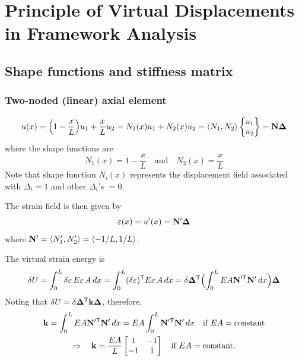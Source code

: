 \chapter[PVD in Framework Analysis]{Principle of Virtual Displacements in Framework Analysis}
\label{ch:pvd2}

\section{Shape functions and stiffness matrix}
\subsection{Two-noded (linear) axial element}
\begin{equation}
  u(x) = \Bigl(1-\frac xL\Bigr)u_1 + \frac xL u_2 = N_1(x)u_1 + N_2(x)u_2 = \langle N_1, N_2\rangle\begin{Bmatrix}u_1\\ u_2\end{Bmatrix} = \mathbf{N}\bm{\Delta}
\end{equation}
where the shape functions are
\begin{equation}
  N_1(x) = 1-\frac xL\quad\text{and}\quad N_2(x) = \frac xL
\end{equation}
Note that shape function $N_i(x)$ represents the displacement field associated with $\Delta_i = 1$ and other $\Delta_i$'s $= 0$.

The strain field is then given by
\begin{equation}
  \varepsilon(x) = u'(x) = \mathbf{N}'\bm{\Delta}
\end{equation}
where $\mathbf{N}' = \langle N_1', N_2'\rangle = \langle -1/L, 1/L\rangle$.

The virtual strain energy is
\begin{equation}
  \delta U = \int_0^L\delta\varepsilon\,E\varepsilon\,A\,dx = \int_0^L(\delta\varepsilon)^{\mathsf{T}} E\varepsilon\,A\,dx = \delta\bm{\Delta}^{\mathsf{T}}\Bigl(\int_0^L EA\mathbf{N}'^{\mathsf{T}}\mathbf{N}'\,dx\Bigr)\bm{\Delta}
\end{equation}
Noting that $\delta U = \delta\bm{\Delta}^{\mathsf{T}}\mathbf{k}\bm{\Delta}$, therefore,
\begin{gather}
  \mathbf{k} = \int_0^L EA\mathbf{N}'^{\mathsf{T}}\mathbf{N}'\,dx = EA\int_0^L\mathbf{N}'^{\mathsf{T}}\mathbf{N}'\,dx\quad\text{if } EA = \text{constant}\\
  \Rightarrow\quad \mathbf{k} = \frac{EA}{L}\begin{bmatrix}1 & -1\\ -1 & 1\end{bmatrix}\quad\text{if } EA = \text{constant.}
\end{gather}

